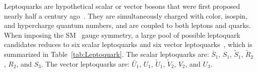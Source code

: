 Leptoquarks are hypothetical scalar or vector bosons that were first proposed nearly half a century ago~\cite{Pati:1973uk}. They are simultaneously charged with color, isospin, and hypercharge quantum numbers, and are coupled to both leptons and quarks. When imposing the \ac{SM} \sm~gauge symmetry, a large pool of possible leptoquark candidates reduces to six scalar leptoquarks and six vector leptoquarks~\cite{Dorsner:2016wpm}, which is summarized in Table~\ref{tab:Leptoquark}. The scalar leptoquarks are: $\bar{S}_{1}$, $S_{1}$, $\tilde{S}_{1}$, $\tilde{R}_{2}$, $R_{2}$, and $S_{3}$. The vector leptoquarks are: $\bar{U}_{1}$, $U_{1}$, $\tilde{U}_{1}$, $\tilde{V}_{2}$, $V_{2}$, and $U_{3}$. 
